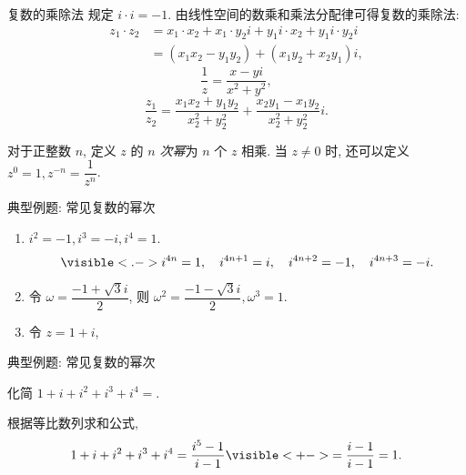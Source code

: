 \begin{frame}{复数的乘除法}
\onslide<+->\alert{规定 $i\cdot i=-1$.}
\onslide<+->由线性空间的数乘和乘法分配律可得复数的乘除法:
\onslide<+->
\begin{align*}
z_1\cdot z_2&=x_1\cdot x_2+x_1\cdot y_2i+y_1i\cdot x_2+y_1i\cdot y_2i\\
&=(x_1x_2-y_1y_2)+(x_1y_2+x_2y_1)i,
\end{align*}
\vspace{-\baselineskip}
\onslide<+->\[\frac1{z}=\frac{x-yi}{x^2+y^2},\]
\onslide<+->\[\frac{z_1}{z_2}=\frac{x_1x_2+y_1y_2}{x_2^2+y_2^2}+\frac{x_2y_1-x_1y_2}{x_2^2+y_2^2}i.\]

\onslide<+->对于正整数 $n$, 定义 $z$ 的 \emph{$n$ 次幂}为 $n$ 个 $z$ 相乘.
\onslide<+->当 $z\neq 0$ 时, 还可以定义 $z^0=1,z^{-n}=\dfrac1{z^n}$.
\end{frame}


\begin{frame}{典型例题: 常见复数的幂次}
\onslide<+->
\begin{example}
\begin{enumerate}
\item $i^2=-1,i^3=-i,i^4=1$.
\[\visible<.->{i^{4n}=1,\quad i^{4n+1}=i,\quad i^{4n+2}=-1,\quad i^{4n+3}=-i.}\]%
\item 令 $\omega=\dfrac{-1+\sqrt 3i}2$, 则 $\omega^2=\dfrac{-1-\sqrt3i}2,\omega^3=1$.
\item 令 $z=1+i$, 
\vspace{-\baselineskip}
\end{enumerate}
\end{example}
\end{frame}


\begin{frame}{典型例题: 常见复数的幂次}
\onslide<+->
\begin{example}
化简 $1+i+i^2+i^3+i^4=$.
\end{example}
\onslide<+->
\begin{solution}
根据等比数列求和公式,
\[1+i+i^2+i^3+i^4=\frac{i^5-1}{i-1}
\visible<+->{=\frac{i-1}{i-1}=1.}\]
\vspace{-\baselineskip}
\end{solution}
\end{frame}


